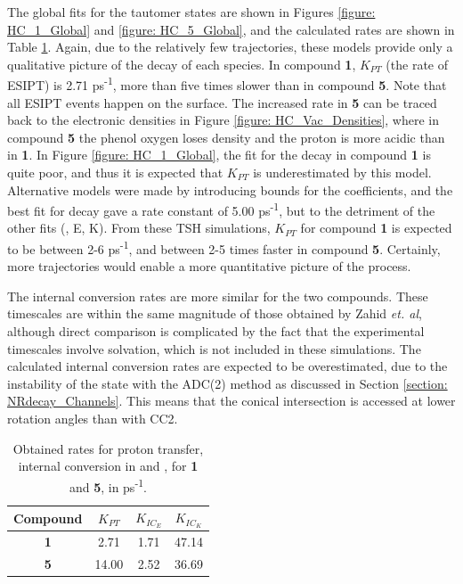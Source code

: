 The global fits for the tautomer states are shown in Figures \ref{figure: HC_1_Global} and \ref{figure: HC_5_Global}, and the calculated rates are shown in Table \ref{table: species_decay_rates}. Again, due to the relatively few trajectories, these models provide only a qualitative picture of the decay of each species.
In compound \textbf{1}, $K_{PT}$ (the rate of ESIPT) is 2.71 ps\textsuperscript{-1},  more than five times slower than in compound \textbf{5}. Note that all ESIPT events happen on the \sone{} surface. The increased rate in \textbf{5} can be traced back to the electronic densities in Figure \ref{figure: HC_Vac_Densities}, where in compound \textbf{5} the phenol oxygen loses density and the proton is more acidic than in \textbf{1}. In Figure \ref{figure: HC_1_Global}, the fit for the \Kstar{} decay in compound \textbf{1} is quite poor, and thus it is expected that $K_{PT}$ is underestimated by this model. Alternative models were made by introducing bounds for the coefficients, and the best fit for \Kstar{} decay gave a rate constant of 5.00 ps\textsuperscript{-1}, but to the detriment of the other fits (\Estar{}, E, K). From these \ac{TSH} simulations, $K_{PT}$ for compound \textbf{1} is expected to be between 2-6 ps\textsuperscript{-1}, and between 2-5 times faster in compound \textbf{5}. Certainly, more trajectories would enable a more quantitative picture of the process.

The internal conversion rates are more similar for the two compounds. These timescales are within the same magnitude of those obtained by Zahid \textit{et. al}, although direct comparison is complicated by the fact that the experimental timescales involve solvation, which is not included in these simulations.\cite{Zahid2017} The calculated internal conversion rates are expected to be overestimated, due to the instability of the \szero{} state with the ADC(2) method as discussed in Section \ref{section: NRdecay_Channels}. This means that the conical intersection is accessed at lower rotation angles than with CC2.  

\begin{table}[b]
\centering
\caption[Obtained rates for tautomer decay processes for compounds \textbf{1} and \textbf{5}]{Obtained rates for proton transfer, internal conversion in \Estar{} and \Kstar{}, for \textbf{1} and \textbf{5}, in ps\textsuperscript{-1}.}
\begin{tabular}{cccc}
    \hline
     Compound & $K_{PT}$ & $K_{IC_{E}}$ & $K_{IC_{K}}$ \\
     \hline
     \textbf{1} & 2.71 & 1.71 & 47.14 \\
     \textbf{5} & 14.00 & 2.52 & 36.69 \\
     \hline
\end{tabular}
\label{table: species_decay_rates}
\end{table}

